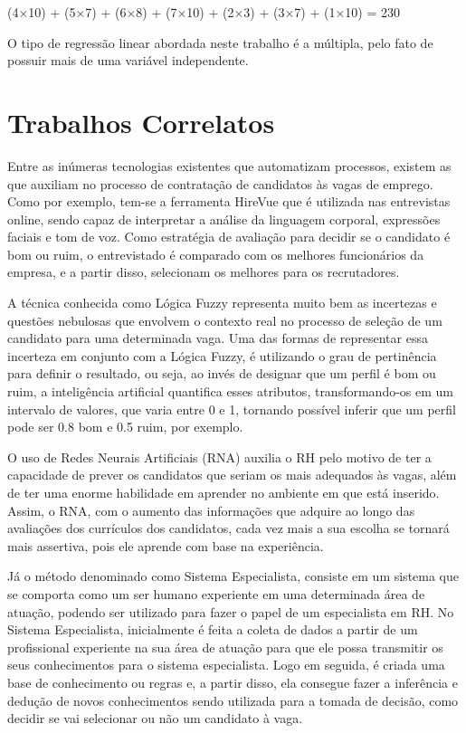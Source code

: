 \documentclass[conference]{IEEEtran}
\begin{document}
(4×10) + (5×7) + (6×8) + (7×10) + (2×3) + (3×7) + (1×10) = 230

O tipo de regressão linear abordada neste trabalho é a múltipla, pelo fato de possuir mais de uma variável independente. 

\section*{Trabalhos Correlatos}
Entre as inúmeras tecnologias existentes que automatizam processos, existem as que auxiliam no processo de contratação de candidatos às vagas de emprego. Como por exemplo, tem-se a ferramenta HireVue que é utilizada nas entrevistas online, sendo capaz de interpretar a análise da linguagem corporal, expressões faciais e tom de voz. Como estratégia de avaliação para decidir se o candidato é bom ou ruim, o entrevistado é comparado com os melhores funcionários da empresa, e a partir disso, selecionam os melhores para os recrutadores.

A técnica conhecida como Lógica Fuzzy representa muito bem as incertezas e questões nebulosas que envolvem o contexto real no processo de seleção de um candidato para uma determinada vaga. Uma das formas de representar essa incerteza em conjunto com a Lógica Fuzzy, é utilizando o grau de pertinência para definir o resultado, ou seja, ao invés de designar que um perfil é bom ou ruim, a inteligência artificial quantifica esses atributos, transformando-os em um intervalo de valores, que varia entre 0 e 1, tornando possível inferir que um perfil pode ser 0.8 bom e 0.5 ruim, por exemplo.

O uso de Redes Neurais Artificiais (RNA) auxilia o RH pelo motivo de ter a capacidade de prever os candidatos que seriam os mais adequados às vagas, além de ter uma enorme habilidade em aprender no ambiente em que está inserido. Assim, o RNA, com o aumento das informações que adquire ao longo das avaliações dos currículos dos candidatos, cada vez mais a sua escolha se tornará mais assertiva, pois ele aprende com base na experiência.

Já o método denominado como Sistema Especialista, consiste em um sistema que se comporta como um ser humano experiente em uma determinada área de atuação, podendo ser utilizado para fazer o papel de um especialista em RH. No Sistema Especialista, inicialmente é feita a coleta de dados a partir de um profissional experiente na sua área de atuação para que ele possa transmitir os seus conhecimentos para o sistema especialista. Logo em seguida, é criada uma base de conhecimento ou regras e, a partir disso, ela consegue fazer a inferência e dedução de novos conhecimentos sendo utilizada para a tomada de decisão, como decidir se vai selecionar ou não um candidato à vaga. 
\end{document}
